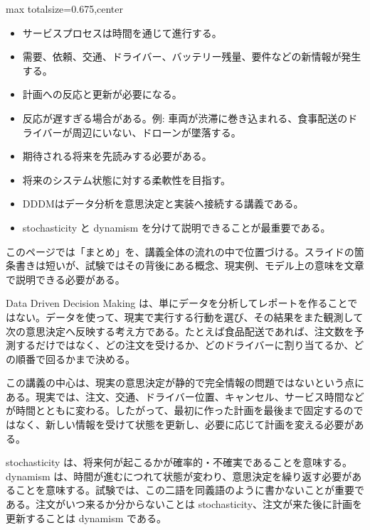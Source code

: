 \clearpage
{}
\begin{adjustbox}{max totalsize={\textwidth}{0.675\textheight},center}
\begin{minipage}{\textwidth}\scriptsize
\begin{minipage}[t]{0.485\textwidth}
\begin{itemize}
\item サービスプロセスは時間を通じて進行する。
\item 需要、依頼、交通、ドライバー、バッテリー残量、要件などの新情報が発生する。
\item 計画への反応と更新が必要になる。
\item 反応が遅すぎる場合がある。例: 車両が渋滞に巻き込まれる、食事配送のドライバーが周辺にいない、ドローンが墜落する。
\item 期待される将来を先読みする必要がある。
\item 将来のシステム状態に対する柔軟性を目指す。
\end{itemize}
\begin{itemize}
\item DDDMはデータ分析を意思決定と実装へ接続する講義である。
\item stochasticity と dynamism を分けて説明できることが最重要である。
\end{itemize}
\end{minipage}\hfill
\begin{minipage}[t]{0.485\textwidth}
このページでは「まとめ」を、講義全体の流れの中で位置づける。スライドの箇条書きは短いが、試験ではその背後にある概念、現実例、モデル上の意味を文章で説明できる必要がある。\par
Data Driven Decision Making は、単にデータを分析してレポートを作ることではない。データを使って、現実で実行する行動を選び、その結果をまた観測して次の意思決定へ反映する考え方である。たとえば食品配送であれば、注文数を予測するだけではなく、どの注文を受けるか、どのドライバーに割り当てるか、どの順番で回るかまで決める。\par
この講義の中心は、現実の意思決定が静的で完全情報の問題ではないという点にある。現実では、注文、交通、ドライバー位置、キャンセル、サービス時間などが時間とともに変わる。したがって、最初に作った計画を最後まで固定するのではなく、新しい情報を受けて状態を更新し、必要に応じて計画を変える必要がある。\par
stochasticity は、将来何が起こるかが確率的・不確実であることを意味する。dynamism は、時間が進むにつれて状態が変わり、意思決定を繰り返す必要があることを意味する。試験では、この二語を同義語のように書かないことが重要である。注文がいつ来るか分からないことは stochasticity、注文が来た後に計画を更新することは dynamism である。\par

\end{minipage}
\end{minipage}
\end{adjustbox}
